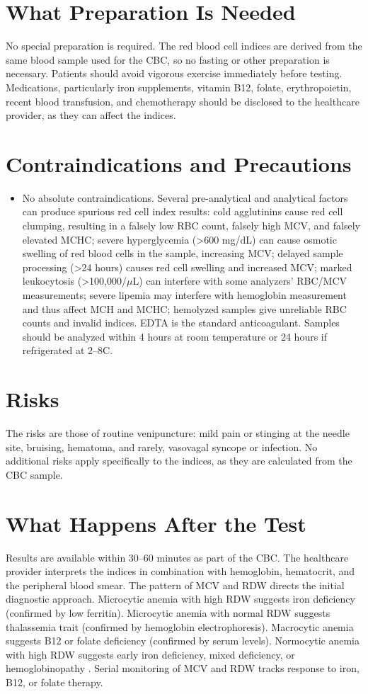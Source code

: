 \section*{What Preparation Is Needed}
No special preparation is required. The red blood cell indices are derived from the same blood sample used for the CBC, so no fasting or other preparation is necessary. Patients should avoid vigorous exercise immediately before testing. Medications, particularly iron supplements, vitamin B12, folate, erythropoietin, recent blood transfusion, and chemotherapy should be disclosed to the healthcare provider, as they can affect the indices.

\section*{Contraindications and Precautions}
\begin{itemize}
  \item No absolute contraindications. Several pre-analytical and analytical factors can produce spurious red cell index results: cold agglutinins cause red cell clumping, resulting in a falsely low RBC count, falsely high MCV, and falsely elevated MCHC; severe hyperglycemia (>600 mg/dL) can cause osmotic swelling of red blood cells in the sample, increasing MCV; delayed sample processing (>24 hours) causes red cell swelling and increased MCV; marked leukocytosis (>100,000/$\mu$L) can interfere with some analyzers' RBC/MCV measurements; severe lipemia may interfere with hemoglobin measurement and thus affect MCH and MCHC; hemolyzed samples give unreliable RBC counts and invalid indices. EDTA is the standard anticoagulant. Samples should be analyzed within 4 hours at room temperature or 24 hours if refrigerated at 2--8\textdegree{}C.
\end{itemize}
\section*{Risks}
The risks are those of routine venipuncture: mild pain or stinging at the needle site, bruising, hematoma, and rarely, vasovagal syncope or infection. No additional risks apply specifically to the indices, as they are calculated from the CBC sample.

\section*{What Happens After the Test}
Results are available within 30--60 minutes as part of the CBC. The healthcare provider interprets the indices in combination with hemoglobin, hematocrit, and the peripheral blood smear. The pattern of MCV and RDW directs the initial diagnostic approach. Microcytic anemia with high RDW suggests iron deficiency (confirmed by low ferritin). Microcytic anemia with normal RDW suggests thalassemia trait (confirmed by hemoglobin electrophoresis). Macrocytic anemia suggests B12 or folate deficiency (confirmed by serum levels). Normocytic anemia with high RDW suggests early iron deficiency, mixed deficiency, or hemoglobinopathy \cite{wallach2022interpretation}. Serial monitoring of MCV and RDW tracks response to iron, B12, or folate therapy.

